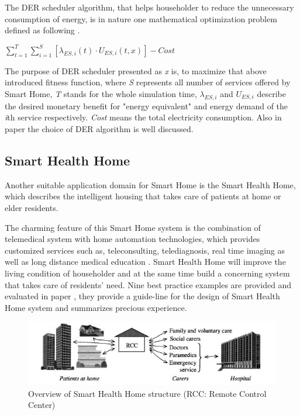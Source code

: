 The DER scheduler algorithm, that helps householder to reduce the unnecessary consumption of energy, is in nature one mathematical optimization problem defined as following \cite{smart_home_for_energy}.
\begin{center}
 $ \sum_{t=1}^{T}\sum_{i=1}^{S}[\lambda_{ES,i}(t)\cdot {U_{ES,i}}(t,x)]-Cost$
\end{center}

The purpose of DER scheduler presented as \emph{x} is, to maximize that above introduced fitness function, where \emph{S} represents all number of services offered by Smart Home, \emph{T} stands for the whole simulation time, $\lambda_{ES,i}$ and $ U_{ES,i}$ describe the desired monetary benefit for "energy equivalent" and energy demand of the \emph{i}th service respectively. \emph{Cost} means the total electricity consumption. Also in paper \cite{smart_home_for_energy} the choice of DER algorithm is well discussed.


\subsection{Smart Health Home}
Another suitable application domain for Smart Home is the Smart Health Home, which describes the intelligent housing that takes care of patients at home or elder residents.

The charming feature of this Smart Home system is the combination of telemedical system with home automation technologies, which provides customized services such as, teleconsulting, telediagnosis, real time imaging as well as long distance medical education \cite{smart_home_for_health}. Smart Health Home will improve the living condition of householder and at the same time build a concerning system that takes care of residents' need. Nine best practice examples are provided and evaluated in paper \cite{smart_home_for_old}, they provide a guide-line for the design of Smart Health Home system and summarizes precious experience. 
 \begin{figure}[!htbp]
	\centering
	\includegraphics[width=1.0\textwidth]{rcc.jpg}
		\caption{Overview of Smart Health Home structure \cite{smart_home_for_health} (RCC: Remote Control Center)}
	\label{fig:rcc}
\end{figure}
